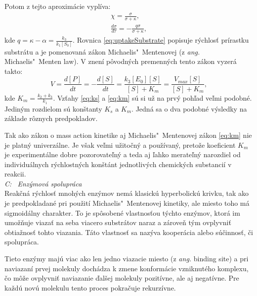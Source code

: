 \documentclass[11pt,final,oneside]{fithesis}
\begin{document}
Potom z tejto aproxim\'acie vypl\'iva:
\begin{align}
\chi = \frac{\sigma}{\sigma + \kappa},\\
\label{eq:uptakeSubstrate}
\frac{d\sigma}{d\tau} = -\frac{q\sigma}{\sigma + \kappa},
\end{align}
kde $q = \kappa - \alpha = \frac{k_3}{k_1[S_0]}$. Rovnica \ref{eq:uptakeSubstrate} popisuje r\'ychlos\v t pr\'irastku substr\'atu a je pomenovan\'a 
z\'akon Michaelis"~Mentenovej (z \textit{ang.} Michaelis"~Menten law). V znen\'i p\^ ovodn\'ych premenn\'ych tento z\'akon vyzer\'a takto:
\begin{equation}
\label{eq:km}
V = \frac{d[P]}{dt} = -\frac{d[S]}{dt} = \frac{k_3[E_0][S]}{[S] + K_m} = \frac{V_{max}[S]}{[S] + K_m},
\end{equation}
kde $K_m = \frac{k_2 + k_3}{k_1}$. Vz\v tahy \ref{eq:ks} a \ref{eq:km} s\'u si u\v z na prv\'y poh\v lad ve\v lmi podobn\'e. Jedin\'ym rozdielom s\'u
kon\v stanty $K_s$ a $K_m$. Jedn\'a sa o dva podobn\'e v\'ysledky na z\'aklade r\^ oznych predpokladov.

Tak ako z\'akon o mass action kinetike aj Michaelis"~Mentenovej z\'akon \ref{eq:km} nie je platn\'y univerz\'alne. Je v\v sak ve\v lmi u\v zito\v cn\'y 
a pou\v z\'ivan\'y, preto\v ze koeficient $K_m$ je experiment\'alne dobre pozorovate\v ln\'y a teda aj \v lahko merate\v ln\'y narozdiel od individu\'alnych
r\'ychlostn\'ych kon\v st\'ant jednotliv\'ych chemick\'ych substanci\'i v reakcii. \cite{Keener:1998:MP:Enzymes}
\\

\noindent
\textit{C: \ Enz\'ymov\'a spolupr\'aca}
\\

Reak\v cn\'a r\'ychlos\v t mnoh\'ych enz\'ymov nem\'a klasick\'u hyperbolick\'u kriv\-ku, tak ako je predpokladan\'e pri pou\v zit\'i Michaelis"~Mentenovej 
kinetiky, ale miesto toho m\'a sigmoid\'alny charakter. To je sp\^ osoben\'e vlastnos\v tou t\'ychto enz\'ymov, ktor\'a im umo\v z\v nuje viaza\v t na seba
viacero substr\'atov naraz a z\'arove\v n t\'ym ovplyvni\v t obtia\v znos\v t tohto viazania. T\'ato vlastnos\v t sa naz\'yva kooper\'acia alebo 
s\'u\v cinnos\v t, \v ci spolupr\'aca.

Tieto enz\'ymy maj\'u viac ako len jedno viazacie miesto (z \textit{ang.} binding site) a pri naviazan\'i prvej molekuly doch\'adza k zmene konform\'acie 
vzniknut\'eho komplexu, \v co m\^ o\v ze ovplyvni\v t naviazanie \v dal\v sej molekuly pozit\'ivne, ale aj negat\'ivne. Pre ka\v zd\'u nov\'u molekulu tento 
proces pokra\v cuje rekurz\'ivne.
\end{document}
